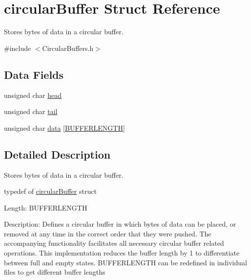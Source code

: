 \hypertarget{structcircularBuffer}{\section{circular\+Buffer Struct Reference}
\label{structcircularBuffer}
}


Stores bytes of data in a circular buffer.  




{\ttfamily \#include $<$Circular\+Buffers.\+h$>$}

\subsection*{Data Fields}
\begin{DoxyCompactItemize}
\item 
unsigned char \hyperlink{structcircularBuffer_a47f7e6109597e5c1c227993c0ce5f560}{head}
\item 
unsigned char \hyperlink{structcircularBuffer_af18a1d7542e277284c4794593b049258}{tail}
\item 
unsigned char \hyperlink{structcircularBuffer_ad7b57ba90694482456be1fbab7de4aec}{data} \mbox{[}\hyperlink{CircularBuffers_8h_a5a69f707d5405fe875b322c6bfbace46}{B\+U\+F\+F\+E\+R\+L\+E\+N\+G\+T\+H}\mbox{]}
\end{DoxyCompactItemize}


\subsection{Detailed Description}
Stores bytes of data in a circular buffer. 



 typedef of \hyperlink{structcircularBuffer}{circular\+Buffer} struct

Length\+: B\+U\+F\+F\+E\+R\+L\+E\+N\+G\+T\+H

Description\+: Defines a circular buffer in which bytes of data can be placed, or removed at any time in the correct order that they were pushed. The accompanying functionality facilitates all necessary circular buffer related operations. This implementation reduces the buffer length by 1 to differentiate between full and empty states. B\+U\+F\+F\+E\+R\+L\+E\+N\+G\+T\+H can be redefined in individual files to get different buffer lengths 

